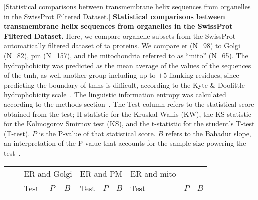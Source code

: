     \begin{table}[htbp]
    \centering
    [Statistical comparisons between transmembrane helix sequences from organelles in the SwissProt Filtered Dataset.]
    {\textbf{Statistical comparisons between transmembrane helix sequences from organelles in the SwissProt Filtered Dataset.}
    Here, we compare organelle subsets from the SwissProt automatically filtered dataset of \gls{ta} proteins.
    We compare \gls{er} (N=98) to Golgi (N=82), \gls{pm} (N=157), and the mitochondria referred to as ``mito'' (N=65).
    The hydrophobicity was predicted as the mean average of the values of the sequences of the \gls{tmh}, as well another group including up to $\pm$5 flanking residues, since predicting the boundary of \gls{tmh}s is difficult, according to the Kyte \& Doolittle hydrophobicity scale~\cite{Kyte1982}.
    The linguistic information entropy was calculated according to the methods section~\cite{Shannon1948}.
    The Test column refers to the statistical score obtained from the test; H statistic for the Kruskal Wallis (KW), the KS statistic for the Kolmogorov Smirnov test (KS), and the t-statistic for the student's T-test (T-test).
    $P$ is the P\--value of that statistical score.
    $B$ refers to the Bahadur slope, an interpretation of the P\--value that accounts for the sample size powering the test~\cite{Bahadur1967, Bahadur1971}.}
        \tiny

         \begin{tabular}{ccccccccccc}
                                &       & \multicolumn{3}{c}{ER and Golgi} & \multicolumn{3}{c}{ER and PM} & \multicolumn{1}{l}{ER and mito} &       &  \\
                                &       & \multicolumn{1}{l}{Test} & \multicolumn{1}{l}{$P$} & \multicolumn{1}{l}{$B$} & \multicolumn{1}{l}{Test} & \multicolumn{1}{l}{$P$} & \multicolumn{1}{l}{$B$} & \multicolumn{1}{l}{Test} & \multicolumn{1}{l}{$P$} & \multicolumn{1}{l}{$B$} \\


\end{tabular}
\end{table}
